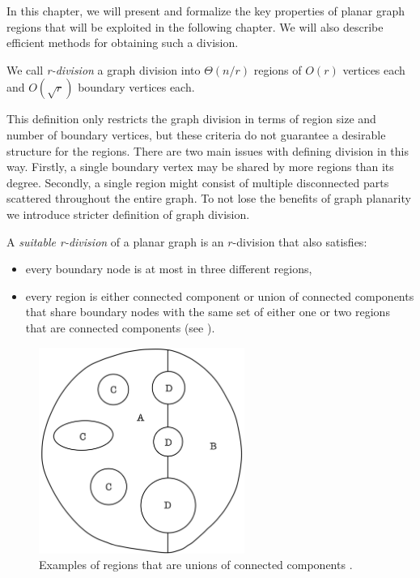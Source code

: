 
In this chapter, we will present and formalize the key properties of planar graph regions that will be exploited in the following chapter. We will also describe efficient methods for obtaining such a division.

\begin{defn} 
\label{$r$-division}
We call \emph{r-division} a graph division into $\Theta(n/r)$ regions of $O(r)$ vertices each and $O(\sqrt{r})$ boundary vertices each.
\end{defn}

This definition only restricts the graph division in terms of region size and number of boundary vertices, but these criteria do not guarantee a desirable structure for the regions. There are two main issues with defining division in this way. Firstly, a single boundary vertex may be shared by more regions than its degree. Secondly, a single region might consist of multiple disconnected parts scattered throughout the entire graph. To not lose the benefits of graph planarity we introduce stricter definition of graph division.

\begin{defn} 
\label{suitable}
A \emph{suitable r-division} of a planar graph is an $r$-division that also satisfies:
\begin{itemize}
    \item every boundary node is at most in three different regions,
    \item every region is either connected component or union of connected components that share boundary nodes with the same set of either one or two regions that are connected components (see ).
\end{itemize}
\end{defn}

\begin{figure}[H]
    \centering
        \includegraphics[width=0.6\textwidth]{2-Graph_Division/assets/IMG_8196.JPG}
    \caption{Examples of regions that are unions of connected components \cite{frederickson}.}
    \label{fig:suitableExample}
\end{figure}

